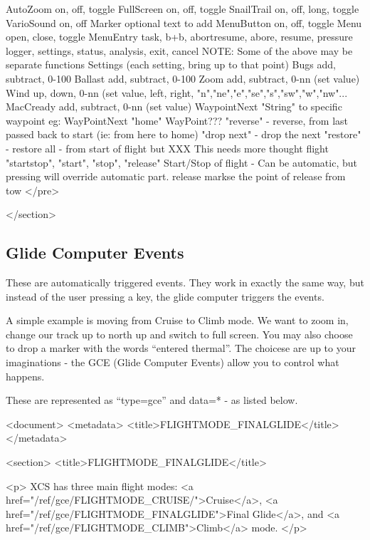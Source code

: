 				AutoZoom		on, off, toggle 
				FullScreen		on, off, toggle
				SnailTrail 		on, off, long, toggle
				VarioSound 		on, off
				Marker 			optional text to add
				MenuButton 		on, off, toggle
				Menu			open, close, toggle
				MenuEntry		task, b+b, abortresume, abore, resume, pressure
				logger, settings, status, analysis, exit, cancel
				NOTE: Some of the above may be separate functions
				Settings		(each setting, bring up to that point)
				Bugs			add, subtract, 0-100%
				Ballast			add, subtract, 0-100%
				Zoom			add, subtract, 0-nn (set value)
				Wind			up, down, 0-nn (set value, left, right, "n","ne","e","se","s","sw","w","nw"...
				MacCready		add, subtract, 0-nn (set value)
				WaypointNext		"String" to specific waypoint
				eg: WayPointNext "home"
				WayPoint???		"reverse" - reverse, from last passed back to start (ie: from here to home)
				"drop next" - drop the next
				"restore" - restore all - from start of flight but 
				XXX This needs more thought
				flight 			"startstop", "start", "stop", "release"
				Start/Stop of flight - Can be automatic, but pressing will override
				automatic part.
				release 		markse the point of release from tow
</pre>

			</section>


\subsection{Glide Computer Events}

These are automatically triggered events. They work in exactly the
same way, but instead of the user pressing a key, the glide computer
triggers the events.

A simple example is moving from Cruise to Climb mode. We want to zoom
in, change our track up to north up and switch to full screen. You may
also choose to drop a marker with the words ``entered thermal''. The
choicese are up to your imaginations - the GCE (Glide Computer Events)
allow you to control what happens.

These are represented as ``type=gce'' and data=* - as listed below.


<document>
        <metadata>
                <title>FLIGHTMODE_FINALGLIDE</title>
        </metadata>

<section>
                <title>FLIGHTMODE_FINALGLIDE</title>

<p>
XCS has three main flight modes: <a
href="/ref/gce/FLIGHTMODE_CRUISE/">Cruise</a>, <a
href="/ref/gce/FLIGHTMODE_FINALGLIDE">Final Glide</a>, and <a
href="/ref/gce/FLIGHTMODE_CLIMB">Climb</a> mode.
</p>

